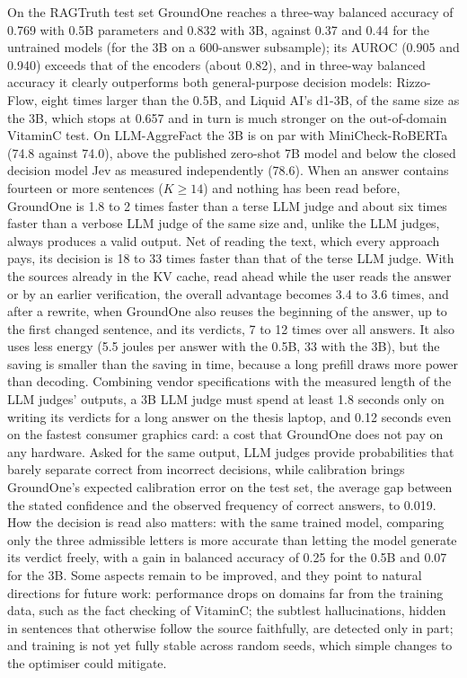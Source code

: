 On the RAGTruth test set GroundOne reaches a three-way balanced accuracy of 0.769 with 0.5B parameters and 0.832 with 3B,
against 0.37 and 0.44 for the untrained models (for the 3B on a 600-answer subsample); its AUROC (0.905 and 0.940)
exceeds that of the encoders (about 0.82), and in three-way balanced accuracy it clearly outperforms both general-purpose
decision models: Rizzo-Flow, eight times larger than the 0.5B, and Liquid AI's d1-3B, of the same size as the 3B, which
stops at 0.657 and in turn is much stronger on the out-of-domain VitaminC test. On
LLM-AggreFact the 3B is on par with MiniCheck-RoBERTa (74.8 against 74.0), above
the published zero-shot 7B model and below the closed decision model Jev as measured independently (78.6). When an answer contains fourteen or more sentences ($K \geq 14$) and nothing has been read before, GroundOne is 1.8 to 2 times faster than a terse LLM judge and about six times faster than a verbose LLM judge of the same size and,
unlike the LLM judges, always produces a valid output. Net of reading the text, which every approach pays, its decision is 18 to 33 times faster than that of the terse LLM judge. With the sources already in the KV cache, read ahead while the user reads the answer or by an earlier verification, the overall advantage becomes 3.4 to 3.6 times, and after a rewrite, when GroundOne also reuses the beginning of the answer, up to the first changed sentence, and its verdicts, 7 to 12 times over all answers. It also uses less energy (5.5 joules per answer with the 0.5B, 33 with
the 3B), but the saving is smaller than the saving in time, because a long prefill draws more power than decoding. Combining vendor specifications with the measured length of the
LLM judges' outputs, a 3B LLM judge must spend at least 1.8 seconds only on writing its verdicts for a long answer on the thesis
laptop, and 0.12 seconds even on the fastest consumer graphics card: a cost that GroundOne does not pay on any hardware. Asked
for the same output, LLM judges provide probabilities that barely separate correct from incorrect decisions,
while calibration brings GroundOne's expected calibration error on the test set, the average gap between the stated
confidence and the observed frequency of correct answers, to 0.019. How the decision is read also
matters: with the same trained model, comparing only the three admissible letters is more accurate than letting the model
generate its verdict freely, with a gain in balanced accuracy of 0.25 for the 0.5B and 0.07 for the 3B. Some aspects
remain to be improved, and they point to natural directions for future work: performance drops on domains far from the
training data, such as the fact checking of VitaminC; the subtlest hallucinations, hidden in sentences that otherwise
follow the source faithfully, are detected only in part; and training is not yet fully stable across random seeds, which
simple changes to the optimiser could mitigate.

